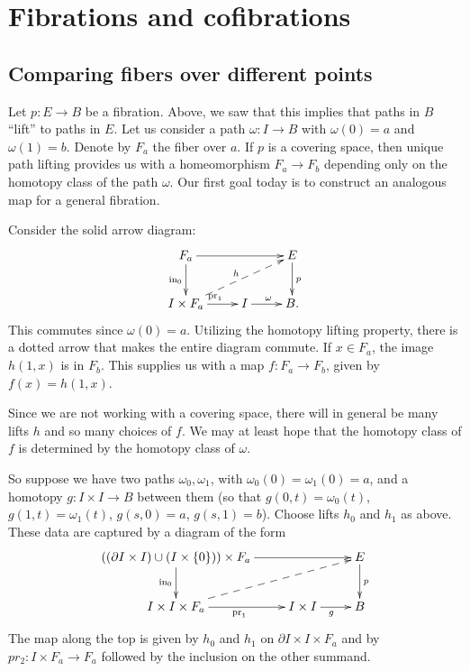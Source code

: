 \section{Fibrations and cofibrations}
\subsection{Comparing fibers over different points}
Let $p:E\to B$ be a fibration.
Above, we saw that this implies that paths in $B$ ``lift'' to paths in $E$.
Let us consider a path $\omega:I\to B$ with $\omega(0) = a$ and $\omega(1) = b$.
Denote by $F_a$ the fiber over $a$. If $p$ is a covering space, then 
unique path lifting provides us with a homeomorphism $F_a\to F_b$ depending
only on the homotopy class of the path $\omega$. Our first goal today is
to construct an analogous map for a general fibration. 

Consider the solid arrow diagram:
\begin{equation*}
    \xymatrix{
	F_a\ar[d]_{\mathrm{in}_0}\ar[rr] & & E\ar[d]^p\\
	I\times F_a\ar@{-->}[urr]^{h}\ar[r]^{\mathrm{pr}_1} & I\ar[r]^{\omega} & B.
    }
\end{equation*}
This commutes since $\omega(0) = a$.
Utilizing the homotopy lifting property, there is a dotted arrow that makes the entire diagram commute.
If $x\in F_a$, the image $h(1,x)$ is in $F_b$.
This supplies us with a map $f:F_a\to F_b$, given by $f(x) = h(1,x)$.

Since we are not working with a covering space, there will in general be
many lifts $h$ and so many choices of $f$. We may at least hope that the 
homotopy class of $f$ is determined by the homotopy class of $\omega$. 

So suppose we have two paths $\omega_0,\omega_1$, with $\omega_0(0) = \omega_1(0) = a$, and a homotopy $g:I\times I\to B$ between them (so that $g(0,t)=\omega_0(t)$, $g(1,t)=\omega_1(t)$, $g(s,0)=a$, $g(s,1)=b$). 
Choose lifts $h_0$ and $h_1$ as above. 
These data are captured by a diagram of the form
\begin{equation*}
    \xymatrix{
	((\partial I\times I)\cup (I\times \{0\}))\times F_a\ar[d]_{\mathrm{in}_0}\ar[rr] & & E\ar[d]^p\\
	I\times I\times F_a\ar[r]_{\mathrm{pr}_1}\ar@{-->}[urr] & I\times I\ar[r]_g & B
    }
\end{equation*}
The map along the top is given by $h_0$ and $h_1$ on 
$\partial I\times I\times F_a$ and by $pr_2:I\times F_a\to F_a$ followed by
the inclusion on the other summand. 

